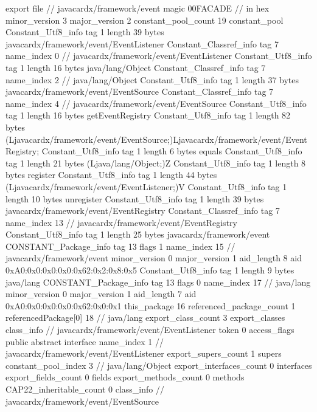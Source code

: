 export file {		// javacardx/framework/event
	magic	00FACADE		 // in hex
	minor_version	3
	major_version	2
	constant_pool_count	19
	constant_pool {
		Constant_Utf8_info {
			tag	1
			length	39
			bytes	javacardx/framework/event/EventListener
		}
		Constant_Classref_info {
			tag	7
			name_index	0		// javacardx/framework/event/EventListener
		}
		Constant_Utf8_info {
			tag	1
			length	16
			bytes	java/lang/Object
		}
		Constant_Classref_info {
			tag	7
			name_index	2		// java/lang/Object
		}
		Constant_Utf8_info {
			tag	1
			length	37
			bytes	javacardx/framework/event/EventSource
		}
		Constant_Classref_info {
			tag	7
			name_index	4		// javacardx/framework/event/EventSource
		}
		Constant_Utf8_info {
			tag	1
			length	16
			bytes	getEventRegistry
		}
		Constant_Utf8_info {
			tag	1
			length	82
			bytes	(Ljavacardx/framework/event/EventSource;)Ljavacardx/framework/event/EventRegistry;
		}
		Constant_Utf8_info {
			tag	1
			length	6
			bytes	equals
		}
		Constant_Utf8_info {
			tag	1
			length	21
			bytes	(Ljava/lang/Object;)Z
		}
		Constant_Utf8_info {
			tag	1
			length	8
			bytes	register
		}
		Constant_Utf8_info {
			tag	1
			length	44
			bytes	(Ljavacardx/framework/event/EventListener;)V
		}
		Constant_Utf8_info {
			tag	1
			length	10
			bytes	unregister
		}
		Constant_Utf8_info {
			tag	1
			length	39
			bytes	javacardx/framework/event/EventRegistry
		}
		Constant_Classref_info {
			tag	7
			name_index	13		// javacardx/framework/event/EventRegistry
		}
		Constant_Utf8_info {
			tag	1
			length	25
			bytes	javacardx/framework/event
		}
		CONSTANT_Package_info {
			tag	13
			flags	1
			name_index	15		// javacardx/framework/event
			minor_version	0
			major_version	1
			aid_length	8
			aid	0xA0:0x0:0x0:0x0:0x62:0x2:0x8:0x5
		}
		Constant_Utf8_info {
			tag	1
			length	9
			bytes	java/lang
		}
		CONSTANT_Package_info {
			tag	13
			flags	0
			name_index	17		// java/lang
			minor_version	0
			major_version	1
			aid_length	7
			aid	0xA0:0x0:0x0:0x0:0x62:0x0:0x1
		}
	}
	this_package	16
	referenced_package_count	1
	referencedPackage[0]	18		// java/lang
	export_class_count	3
	export_classes {
		class_info {		// javacardx/framework/event/EventListener
			token	0
			access_flags	public abstract interface
			name_index	1		// javacardx/framework/event/EventListener
			export_supers_count	1
			supers {
				constant_pool_index	3		// java/lang/Object
			}
			export_interfaces_count	0
			interfaces {
			}
			export_fields_count	0
			fields {
			}
			export_methods_count	0
			methods {
			}
			CAP22_inheritable_count	0
		}
		class_info {		// javacardx/framework/event/EventSource
}}}
